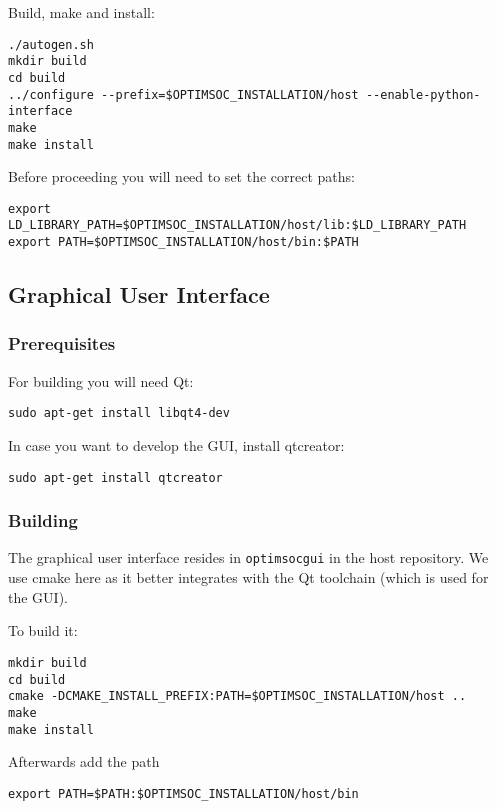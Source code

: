Build, make and install:

\begin{lstlisting}
./autogen.sh
mkdir build
cd build
../configure --prefix=$OPTIMSOC_INSTALLATION/host --enable-python-interface
make
make install
\end{lstlisting}

Before proceeding you will need to set the correct paths:

\begin{lstlisting}
export LD_LIBRARY_PATH=$OPTIMSOC_INSTALLATION/host/lib:$LD_LIBRARY_PATH
export PATH=$OPTIMSOC_INSTALLATION/host/bin:$PATH
\end{lstlisting}

\subsection{Graphical User Interface}

\subsubsection{Prerequisites}

For building you will need Qt:

\begin{lstlisting}
sudo apt-get install libqt4-dev
\end{lstlisting}

In case you want to develop the GUI, install qtcreator:

\begin{lstlisting}
sudo apt-get install qtcreator
\end{lstlisting}

\subsubsection{Building}

The graphical user interface resides in \verb|optimsocgui| in the host
repository. We use cmake here as it better integrates with the Qt
toolchain (which is used for the GUI).

To build it:

\begin{lstlisting}
mkdir build
cd build
cmake -DCMAKE_INSTALL_PREFIX:PATH=$OPTIMSOC_INSTALLATION/host ..
make
make install
\end{lstlisting}

Afterwards add the path

\begin{lstlisting}
export PATH=$PATH:$OPTIMSOC_INSTALLATION/host/bin
\end{lstlisting}

